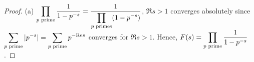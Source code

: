 \begin{proof}
    (a)  $ \displaystyle\prod_{p\text{ prime}}\frac{1}{1-p^{-s}}=\frac{1}{\displaystyle \prod_{p\text{ primes}}(1-p^{-s})} $,  $ \Re s>1 $ converges absolutely since  $ \displaystyle\sum_{p\text{ prime}}|p^{-s}|=\sum_{p\text{ prime}}p^{-\mathrm{Re} s} $ converges for  $ \Re s>1 $. Hence,  $ F(s)=\displaystyle\prod_{p\text{ prime}}\frac{1}{1-p^{-s}} $.     
\end{proof}